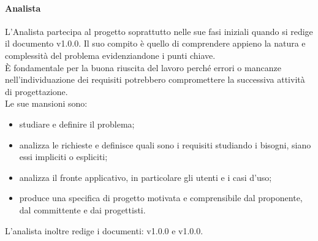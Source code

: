             \paragraph{Analista}
                L’Analista partecipa al progetto soprattutto nelle sue fasi iniziali quando si redige il documento  v1.0.0. Il suo compito è quello di comprendere appieno la natura e complessità del problema evidenziandone i punti chiave. \\
                È fondamentale per la buona riuscita del lavoro perché errori o mancanze nell’individuazione dei requisiti potrebbero compromettere la successiva attività di progettazione.\\
                Le sue mansioni sono:\\
                \begin{itemize}
                    \item studiare e definire il problema;
                    \item analizza le richieste e definisce quali sono i requisiti studiando i bisogni, siano essi impliciti o espliciti;
                    \item analizza il fronte applicativo, in particolare gli utenti e i casi d’uso;
                    \item produce una specifica di progetto motivata e comprensibile dal proponente, dal committente e dai progettisti.
                \end{itemize}
                L’analista inoltre redige i documenti:  v1.0.0 e  v1.0.0.

